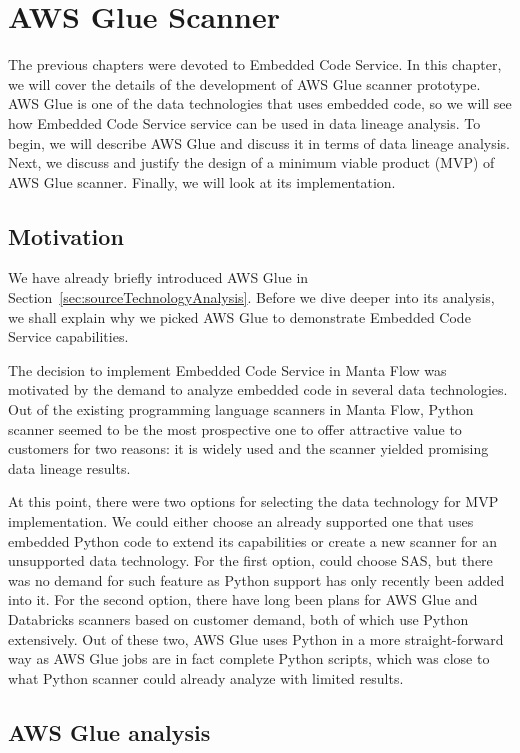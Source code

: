 \chapter{AWS Glue Scanner}

The previous chapters were devoted to Embedded Code Service. In this chapter, we will cover the details of the development of AWS Glue scanner prototype. AWS Glue is one of the data technologies that uses embedded code, so we will see how Embedded Code Service service can be used in data lineage analysis. To begin, we will describe AWS Glue and discuss it in terms of data lineage analysis. Next, we discuss and justify the design of a minimum viable product (MVP) of AWS Glue  scanner. Finally, we will look at its implementation. 

\section{Motivation}

We have already briefly introduced AWS Glue in Section~\ref{sec:sourceTechnologyAnalysis}. Before we dive deeper into its analysis, we shall explain why we picked AWS Glue to demonstrate Embedded Code Service capabilities.
\par
The decision to implement Embedded Code Service in Manta Flow was motivated by the demand to analyze embedded code in several data technologies. Out of the existing programming language scanners in Manta Flow, Python scanner seemed to be the most prospective one to offer attractive value to customers for two reasons: it is widely used and the scanner yielded promising data lineage results.
\par
At this point, there were two options for selecting the data technology for MVP implementation. We could either choose an already supported one that uses embedded Python code to extend its capabilities or create a new scanner for an unsupported data technology. For the first option, could choose SAS, but there was no demand for such feature as Python support has only recently been added into it. For the second option, there have long been plans for AWS Glue and Databricks scanners based on customer demand, both of which use Python extensively. Out of these two, AWS Glue uses Python in a more straight-forward way as AWS Glue jobs are in fact complete Python scripts, which was close to what Python scanner could already analyze with limited results.

\section{AWS Glue analysis}

